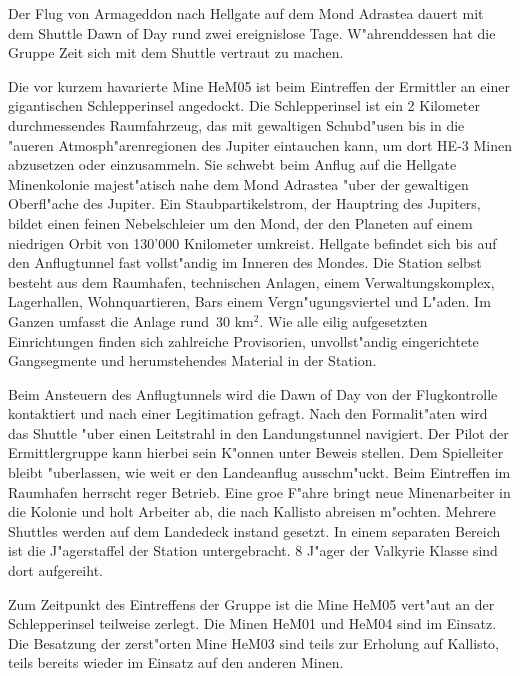 \pagebreak
{}

Der Flug von Armageddon nach Hellgate auf dem Mond Adrastea dauert mit dem Shuttle Dawn of Day rund zwei ereignislose Tage. W"ahrenddessen hat die Gruppe Zeit sich mit dem Shuttle vertraut zu machen. 

Die vor kurzem havarierte Mine HeM05 ist beim Eintreffen der Ermittler an einer gigantischen Schlepperinsel  angedockt. Die Schlepperinsel ist ein 2 Kilometer durchmessendes Raumfahrzeug, das mit gewaltigen Schubd"usen bis in die "au\3eren Atmosph"arenregionen des Jupiter eintauchen kann, um dort HE-3 Minen abzusetzen oder einzusammeln. Sie schwebt beim Anflug auf die Hellgate Minenkolonie majest"atisch nahe dem Mond Adrastea "uber der gewaltigen Oberfl"ache des Jupiter. Ein Staubpartikelstrom, der Hauptring des Jupiters, bildet einen feinen Nebelschleier um den Mond, der den Planeten auf einem niedrigen Orbit von 130'000 Knilometer umkreist. Hellgate befindet sich bis auf den Anflugtunnel fast vollst"andig im Inneren des Mondes. Die Station selbst besteht aus dem Raumhafen, technischen Anlagen, einem Verwaltungskomplex, Lagerhallen, Wohnquartieren, Bars einem Vergn"ugungsviertel und L"aden. Im Ganzen umfasst die Anlage rund~30 km$^{2}$. Wie alle eilig aufgesetzten Einrichtungen finden sich zahlreiche Provisorien, unvollst"andig eingerichtete Gangsegmente und herumstehendes Material in der Station.

Beim Ansteuern des Anflugtunnels wird die Dawn of Day von der Flugkontrolle kontaktiert und nach einer Legitimation gefragt. Nach den  Formalit"aten wird das Shuttle "uber einen Leitstrahl in den Landungstunnel navigiert. Der Pilot der Ermittlergruppe kann hierbei sein K"onnen unter Beweis stellen. Dem Spielleiter bleibt "uberlassen, wie weit er den Landeanflug ausschm"uckt. Beim Eintreffen im Raumhafen herrscht reger Betrieb. Eine gro\3e F"ahre bringt neue Minenarbeiter in die Kolonie und holt Arbeiter ab, die nach Kallisto abreisen m"ochten. Mehrere Shuttles werden auf dem Landedeck instand gesetzt. In einem separaten Bereich ist die J"agerstaffel der Station untergebracht. 8 J"ager der Valkyrie Klasse sind dort aufgereiht. 

Zum Zeitpunkt des Eintreffens der Gruppe ist die Mine HeM05 vert"aut an der Schlepperinsel teilweise zerlegt. Die Minen HeM01 und HeM04 sind im Einsatz. Die Besatzung der zerst"orten Mine HeM03 sind teils zur Erholung auf Kallisto, teils bereits wieder im Einsatz auf den anderen Minen.

